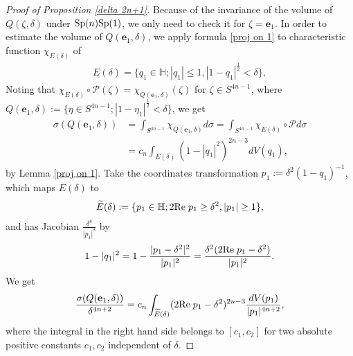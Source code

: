 \documentclass[a4paper,11pt]{amsart}
\numberwithin{equation}{section}
\begin{document}
\begin{proof}[Proof of Proposition \ref{delta 2n+1}]
Because of the invariance of the volume of $Q(\zeta,\delta)$ under ${\rm Sp}(n){\rm Sp}(1)$, we only need to check it for $\zeta=\mathbf{e}_1$.
In order to estimate the volume of $Q(\mathbf{e}_1,\delta)$, we apply  formula \eqref{proj on 1} to characteristic function $\chi_{E(\delta)}$ of
\begin{equation*}\begin{aligned}
E(\delta)=\{q_1\in \mathbb{H};|q_1|\leq1,|1-q_1|^{\frac12}<\delta\},
\end{aligned}\end{equation*}
Noting that $\chi_{E(\delta)}\circ \mathcal{P}(\zeta)=\chi_{Q(\mathbf{e}_1,\delta)}(\zeta)$ for $\zeta\in S^{4n-1}$, where $Q(\mathbf{e}_1,\delta):=\{\eta\in S^{4n-1};|1-\eta_1|^{\frac12}<\delta\}$,
we get
\begin{equation*}\begin{aligned}
\sigma(Q(\mathbf{e}_1,\delta))&=\int_{S^{4n-1}}\chi_{Q(\mathbf{e}_1,\delta)}d\sigma=\int_{S^{4n-1}}\chi_{E(\delta)}\circ \mathcal{P}d\sigma\\
&=c_n\int_{E(\delta)}(1-|q_1|^2)^{2n-3}dV(q_1),
\end{aligned}\end{equation*}
by Lemma \ref{proj on 1}.
Take the coordinates transformation $p_1:=\delta^2(1-q_1)^{-1}$, which maps $E(\delta)$ to
\begin{equation*}\begin{aligned}
\widetilde{E}(\delta):=\{p_1\in \mathbb{H};2{\rm Re}\;p_1\geq\delta^2,|p_1|\geq1\},
\end{aligned}\end{equation*}
and has Jacobian $\frac{\delta^8}{|p_1|^8}$ by
\begin{equation*}\begin{aligned}
1-|q_1|^2=1-\frac{|p_1-\delta^2|^2}{|p_1|^2}=\frac{\delta^2(2{\rm Re}\;p_1-\delta^2)}{|p_1|^2}.
\end{aligned}\end{equation*}
We get
\begin{equation*}\begin{aligned}
\frac{\sigma(Q(\mathbf{e}_1,\delta))}{\delta^{4n+2}}=c_n\int_{\widetilde{E}(\delta)}(2{\rm Re}\;p_1-\delta^2)^{2n-3}\frac{dV(p_1)}{|p_1|^{4n+2}},
\end{aligned}\end{equation*}
where the integral in the right hand side belongs to $[c_1,c_2]$ for two absolute positive constants $c_1,c_2$ independent of $\delta$.
\end{proof}
\end{document}
